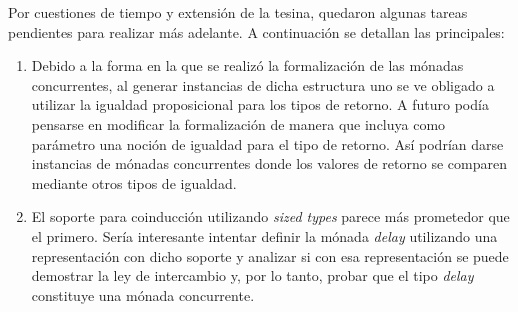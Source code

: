 Por cuestiones de tiempo y extensión de la tesina, quedaron algunas tareas pendientes para realizar más adelante. A continuación se detallan las principales:
\begin{enumerate}
\item Debido a la forma en la que se realizó la formalización de las mónadas concurrentes, al generar instancias de dicha estructura uno se ve obligado a utilizar la igualdad proposicional para los tipos de retorno. A futuro podía pensarse en modificar la formalización de manera que incluya como parámetro una noción de igualdad para el tipo de retorno. Así podrían darse instancias de mónadas concurrentes donde los valores de retorno se comparen mediante otros tipos de igualdad.

\item El soporte para coinducción utilizando \textit{sized types} parece más prometedor que el primero. Sería interesante intentar definir la mónada \textit{delay} utilizando una representación con dicho soporte y analizar si con esa representación se puede demostrar la ley de intercambio y, por lo tanto, probar que el tipo \textit{delay} constituye una mónada concurrente. 
\end{enumerate}